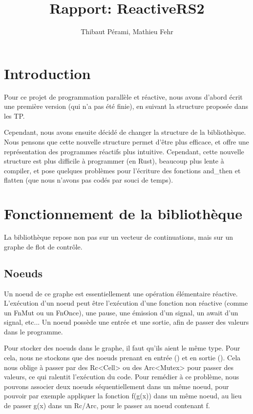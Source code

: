 \documentclass[a4paper]{article}
\title{Rapport: ReactiveRS2}
\author{Thibaut Pérami, Mathieu Fehr}
\renewcommand{\(}{\left(}
\renewcommand{\)}{\right)}
\begin{document}
\maketitle

\section{Introduction}

Pour ce projet de programmation parallèle et réactive, nous avons d'abord écrit
une première version (qui n'a pas été finie), en suivant la structure proposée
dans les TP.

Cependant, nous avons ensuite décidé de changer la structure de la bibliothèque.
Nous pensons que cette nouvelle structure permet d'être plus efficace, et offre
une représentation des programmes réactifs plus intuitive. Cependant, cette
nouvelle structure est plus difficile à programmer (en Rust), beaucoup plus
lente à compiler, et pose quelques
problèmes pour l'écriture des fonctions and\_then et flatten (que nous n'avons
pas codés par souci de temps).

\section{Fonctionnement de la bibliothèque}

La bibliothèque repose non pas sur un vecteur de continuations, mais sur un
graphe de flot de contrôle. 

\subsection{Noeuds}

Un noeud de ce graphe est essentiellement une opération élémentaire
réactive. L'exécution d'un noeud peut être l'exécution d'une fonction non
réactive (comme un FnMut ou un FnOnce), une pause, une émission d'un signal, un
await d'un signal, etc... Un noeud possède une entrée et une sortie, afin de
passer des valeurs dans le programme.

Pour stocker des noeuds dans le graphe, il faut qu'ils aient le même type. Pour
cela, nous ne stockons que des noeuds prenant en entrée () et en sortie ().
Cela nous oblige à passer par des Rc<Cell> ou des Arc<Mutex> pour passer des
valeurs, ce qui ralentit l'exécution du code. Pour remédier à ce problème, nous
pouvons associer deux noeuds séquentiellement dans un même noeud, pour pouvoir
par exemple appliquer la fonction f(g(x)) dans un même noeud, au lieu de passer
g(x) dans un Rc/Arc, pour le passer au noeud contenant f.
\end{document}
